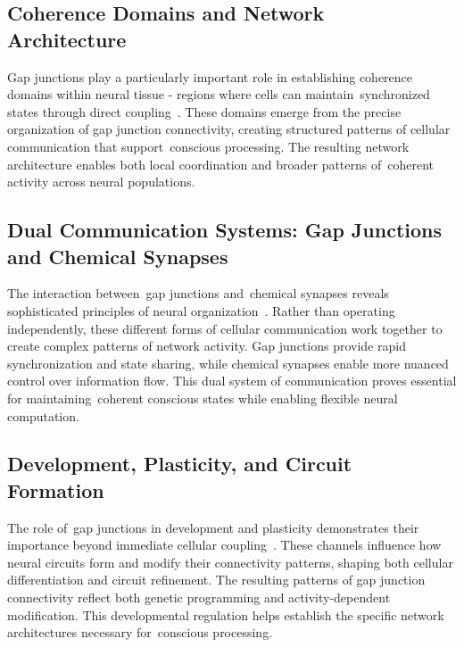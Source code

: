 \subsection*{Coherence Domains and Network Architecture~~}

Gap junctions play a particularly important role in establishing coherence domains within neural tissue - regions where cells can maintain~synchronized states through direct coupling~\cite{Pannasch2013, breakspear2005dynamics}. These domains emerge from the precise organization of gap junction connectivity, creating structured patterns of cellular communication that support~conscious processing. The resulting network architecture enables both local coordination and broader patterns of~coherent activity across neural populations.

\subsection*{Dual Communication Systems: Gap Junctions and Chemical Synapses~~}

The interaction between~gap junctions and~chemical synapses reveals sophisticated principles of neural organization~\cite{Pereda2014, Choquet2013}. Rather than operating independently, these different forms of cellular communication work together to create complex patterns of network activity. Gap junctions provide rapid synchronization and state sharing, while chemical synapses enable more nuanced control over information flow. This dual system of communication proves essential for maintaining~coherent conscious states while enabling flexible neural computation.

\subsection*{Development, Plasticity, and Circuit Formation~~}

The role of~gap junctions in development and plasticity demonstrates their importance beyond immediate cellular coupling~\cite{Nagy2018, gershman2023molecular}. These channels influence how neural circuits form and modify their connectivity patterns, shaping both cellular differentiation and circuit refinement. The resulting patterns of gap junction connectivity reflect both genetic programming and activity-dependent modification. This developmental regulation helps establish the specific network architectures necessary for~conscious processing.

